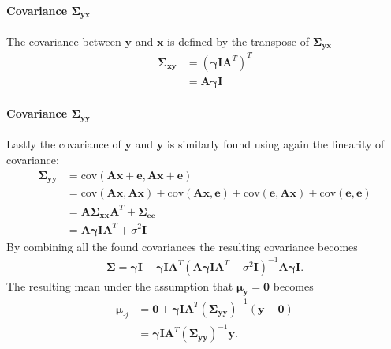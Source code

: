 \paragraph{Covariance $\boldsymbol{\Sigma}_{\mathbf{yx}}$}
The covariance between $\mathbf{y}$ and $\mathbf{x}$ is defined by the transpose of $\boldsymbol{\Sigma}_{\mathbf{yx}}$
\begin{align*}
\boldsymbol{\Sigma}_{\mathbf{xy}} &= \left( \boldsymbol{\gamma} \mathbf{I} \mathbf{A}^T\right)^T\\
&= \textbf{A}\boldsymbol{\gamma}\mathbf{I}
\end{align*}

\paragraph{Covariance $\boldsymbol{\Sigma}_{\mathbf{yy}}$}
Lastly the covariance of $\mathbf{y}$ and $\mathbf{y}$ is similarly found using again the linearity of covariance:
\begin{align*}
\boldsymbol{\Sigma}_{\mathbf{yy}} &= \text{cov} \left(\mathbf{Ax} + \mathbf{e} , \mathbf{Ax} + \mathbf{e} \right) \\ 
&= \text{cov}\left( \mathbf{Ax},\mathbf{Ax} \right) + \text{cov}\left(\mathbf{Ax},  \mathbf{e} \right) + \text{cov}\left( \mathbf{e}, \mathbf{Ax} \right) + \text{cov}\left( \mathbf{e}, \mathbf{e} \right)\\
&= \textbf{A}\boldsymbol{\Sigma}_{\mathbf{xx}}\textbf{A}^T + \boldsymbol{\Sigma}_{\mathbf{ee}} \\
&= \textbf{A}\boldsymbol{\gamma} \mathbf{I}\textbf{A}^T + \sigma^2 \mathbf{I}
\end{align*} 
By combining all the found covariances the resulting covariance becomes 
\begin{align*}
\boldsymbol{\Sigma} = \boldsymbol{\gamma} \mathbf{I} - \boldsymbol{\gamma} \mathbf{I} \mathbf{A}^T (\textbf{A}\boldsymbol{\gamma} \mathbf{I}\textbf{A}^T + \sigma^2 \mathbf{I})^{-1} \mathbf{A} \boldsymbol{\gamma} \mathbf{I}.
\end{align*}
The resulting mean under the assumption that $\boldsymbol{\mu}_{\mathbf{y}} = \mathbf{0}$ becomes
\begin{align*}
\boldsymbol{\mu}_{\cdot j} &= \mathbf{0} + \boldsymbol{\gamma} \mathbf{I} \mathbf{A}^T \left( \boldsymbol{\Sigma}_{\mathbf{yy}} \right)^{-1} \left(\mathbf{y} - \mathbf{0}\right) \\
&= \boldsymbol{\gamma} \mathbf{I} \mathbf{A}^T \left( \boldsymbol{\Sigma}_{\mathbf{yy}} \right)^{-1} \mathbf{y}.
\end{align*}  

